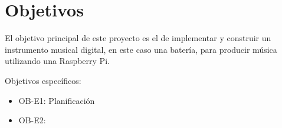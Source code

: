 
\chapter{Objetivos} %
\label{cha:Objetivos}

    El objetivo principal de este proyecto es el de implementar y construir un instrumento musical digital, en este caso
    una batería, para producir música utilizando una Raspberry Pi.

    Objetivos específicos:
    \begin{itemize}
        \item OB-E1: Planificación
        \item OB-E2:
    \end{itemize}


\newpage
